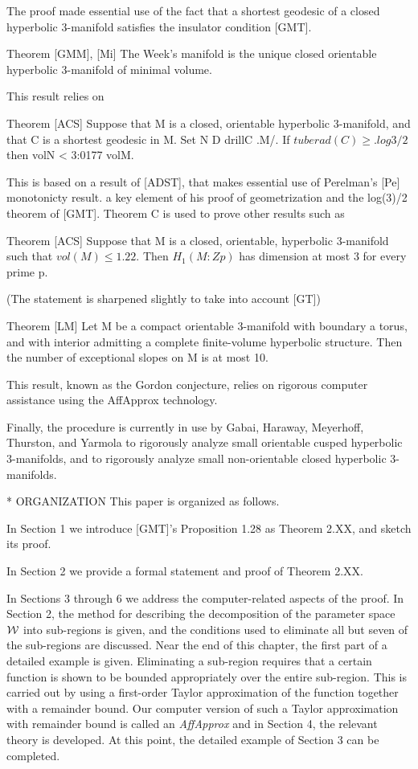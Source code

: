 The proof made essential use of the fact that a shortest geodesic
of a closed hyperbolic 3-manifold satisfies the insulator condition [GMT].

Theorem [GMM], [Mi] The Week's manifold
is the unique closed orientable hyperbolic 3-manifold of minimal volume.

This result relies on 

Theorem  [ACS] Suppose that M is a closed, orientable hyperbolic 3-manifold,
and that C is a shortest geodesic in M.
Set N D drillC .M/. If $tuberad(C) \ge .log 3/2$ then
volN < 3:0177 volM.

This is based on a result of [ADST],
that makes essential use of Perelman's [Pe] monotonicty result.
a key element of his proof of geometrization and the log(3)/2 theorem of [GMT].
Theorem C is used to prove other results such as 

Theorem [ACS] Suppose that M is a closed, orientable, hyperbolic
3-manifold such that $vol(M)\le 1.22$.
Then $H_1(M:Zp)$ has dimension at most 3 for every prime p.

(The statement is sharpened slightly to take into account [GT])

Theorem [LM] Let M be a compact orientable 3-manifold with boundary a torus,
and with interior admitting a complete finite-volume hyperbolic structure.
Then the number of exceptional slopes on M is at most 10.

This result, known as the Gordon conjecture,
relies on rigorous computer assistance using the AffApprox technology.

Finally, the procedure is currently in use
by Gabai, Haraway, Meyerhoff, Thurston, and Yarmola
to rigorously analyze small orientable cusped hyperbolic $3$-manifolds,
and to rigorously analyze small non-orientable closed hyperbolic $3$-manifolds.

* ORGANIZATION
This paper is organized as follows.  

In Section 1 we introduce [GMT]'s Proposition 1.28 as Theorem 2.XX, and sketch its proof.

In Section 2 we provide a formal statement and proof of Theorem 2.XX.

In Sections 3 through 6 we address the computer-related aspects of the 
proof.   In Section 2, the method for describing the decomposition of the 
parameter space ${\cal W}$ into sub-regions is given, and the conditions 
used to eliminate all but seven of the sub-regions are discussed.  Near the 
end of this chapter, the first part of a detailed example is given.  Eliminating 
a sub-region requires that a certain function is shown to be bounded 
appropriately over the entire sub-region.  This is carried out by using a 
first-order Taylor approximation of the function together with a 
remainder 
bound.  Our computer version of such a Taylor approximation with remainder bound 
is called an {\it AffApprox} and in Section 4, the relevant theory is 
developed.  At this point, the detailed example of Section 3 can be 
completed.

